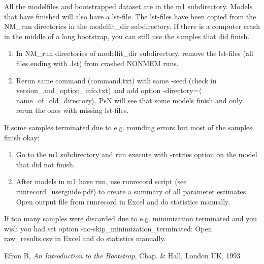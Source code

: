 \documentclass[a4paper,12pt]{article}
\begin{document}
All the modelfiles and bootstrapped dataset are in the m1 subdirectory. Models that have finished will also have a lst-file. The lst-files have been copied from the NM\_run directories in the modelfit\_dir  subdirectory.  
If there is a computer crash in the middle of a long bootstrap, you can still use the samples that did finish. 
\begin{enumerate}
	\item In NM\_run directories of modelfit\_dir subdirectory, remove the lst-files (all files ending with .lst) from crashed NONMEM runs.
	\item Rerun same command (command.txt) with same -seed (check in version\_and\_option\_info.txt) and add option -directory=$\langle$name\_of\_old\_directory$\rangle$. PsN will see that some models finish and only rerun the ones with missing lst-files. 
\end{enumerate}
If some samples terminated due to e.g. rounding errors but most of the samples finish okay: 
\begin{enumerate}
	\item Go to the m1 subdirectory and run execute with -retries option on the model that did not finish. 
	\item After models in m1 have run, use runrecord script (see runrecord\_userguide.pdf) to create a summary of all parameter estimates. Open output file from runrecord in Excel and do statistics manually. 
\end{enumerate}
If too many samples were discarded due to e.g. minimization terminated and you wish you had set  option -no-skip\_minimization\_terminated: Open raw\_results.csv in Excel and do statistics manually. 


\begin{thebibliography}{1}
 Efron B, {\em An Introduction to the Bootstrap}, Chap. \& Hall, London UK, 1993
\end{thebibliography}
\end{document}
